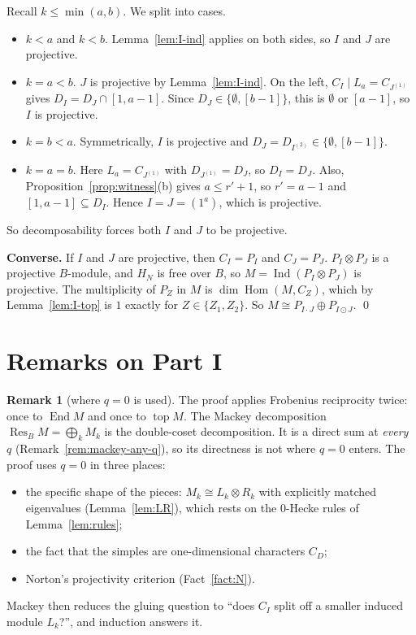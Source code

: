 \documentclass[11pt]{amsart}
\newcommand{\Hom}{\operatorname{Hom}}
\newcommand{\End}{\operatorname{End}}
\newcommand{\Ind}{\operatorname{Ind}}
\newcommand{\Res}{\operatorname{Res}}
\newcommand{\topp}{\operatorname{top}}
\theoremstyle{plain}
\theoremstyle{definition}
\newtheorem{remark}[lemma]{Remark}
\begin{document}
Recall $k\le\min(a,b)$. We split into cases.
\begin{itemize}[itemsep=2pt]
\item $k<a$ and $k<b$. Lemma~\ref{lem:I-ind} applies on both sides, so $I$ and $J$ are projective.
\item $k=a<b$. $J$ is projective by Lemma~\ref{lem:I-ind}. On the left, $C_I\mid L_a=C_{J^{(1)}}$ gives $D_I=D_J\cap[1,a-1]$. Since $D_J\in\{\emptyset,[b-1]\}$, this is $\emptyset$ or $[a-1]$, so $I$ is projective.
\item $k=b<a$. Symmetrically, $I$ is projective and $D_J=D_{I^{(2)}}\in\{\emptyset,[b-1]\}$.
\item $k=a=b$. Here $L_a=C_{J^{(1)}}$ with $D_{J^{(1)}}=D_J$, so $D_I=D_J$. Also, Proposition~\ref{prop:witness}(b) gives $a\le r'+1$, so $r'=a-1$ and $[1,a-1]\subseteq D_I$. Hence $I=J=(1^a)$, which is projective.
\end{itemize}
So decomposability forces both $I$ and $J$ to be projective.

\noindent\textbf{Converse.} If $I$ and $J$ are projective, then $C_I=P_I$ and $C_J=P_J$. $P_I\otimes P_J$ is a projective $B$-module, and $H_N$ is free over $B$, so $M=\Ind(P_I\otimes P_J)$ is projective. The multiplicity of $P_Z$ in $M$ is $\dim\Hom(M,C_Z)$, which by Lemma~\ref{lem:I-top} is $1$ exactly for $Z\in\{Z_1,Z_2\}$. So $M\cong P_{I\cdot J}\oplus P_{I\odot J}$. \qed

\section{Remarks on Part I}

\begin{remark}[where $q=0$ is used]\label{rem:I-q0}
The proof applies Frobenius reciprocity twice: once to $\End M$ and once to $\topp M$. The Mackey decomposition $\Res_BM=\bigoplus_kM_k$ is the double-coset decomposition. It is a direct sum at \emph{every} $q$ (Remark~\ref{rem:mackey-any-q}), so its directness is not where $q=0$ enters. The proof uses $q=0$ in three places:
\begin{itemize}[itemsep=1pt]
\item the specific shape of the pieces: $M_k\cong L_k\otimes R_k$ with explicitly matched eigenvalues (Lemma~\ref{lem:LR}), which rests on the $0$-Hecke rules of Lemma~\ref{lem:rules};
\item the fact that the simples are one-dimensional characters $C_D$;
\item Norton's projectivity criterion (Fact~\ref{fact:N}).
\end{itemize}
Mackey then reduces the gluing question to ``does $C_I$ split off a smaller induced module $L_k$?'', and induction answers it.
\end{remark}
\end{document}
